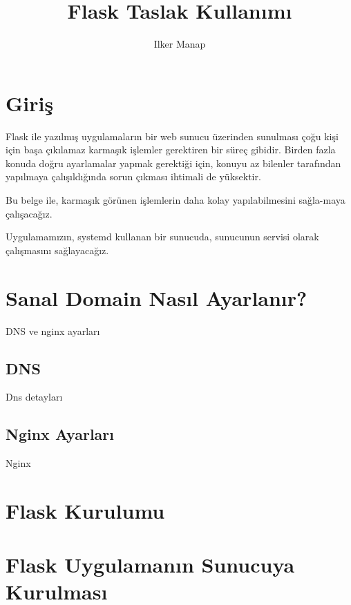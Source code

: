 \documentclass[10pt,a4paper]{book}
\author{Ilker Manap}
\title{Flask Taslak Kullanımı}
\begin{document}
\maketitle
\tableofcontents
\chapter{Giriş}

Flask ile yazılmış uygulamaların bir web sunucu üzerinden sunulması çoğu kişi için 
başa çıkılamaz karmaşık işlemler gerektiren bir süreç gibidir. Birden fazla konuda 
doğru ayarlamalar yapmak gerektiği için, konuyu az bilenler tarafından yapılmaya 
çalışıldığında sorun çıkması ihtimali de yüksektir.

Bu belge ile, karmaşık görünen işlemlerin daha kolay yapılabilmesini sağla-maya 
çalışacağız. 

Uygulamamızın, systemd kullanan bir sunucuda, sunucunun servisi olarak çalışmasını 
sağlayacağız. 


\chapter{Sanal Domain Nasıl Ayarlanır?}
DNS ve nginx ayarları
\section{DNS}
Dns detayları

\section{Nginx Ayarları}
Nginx

\chapter{Flask Kurulumu}



\chapter{Flask Uygulamanın Sunucuya Kurulması}

\printindex
\end{document}
